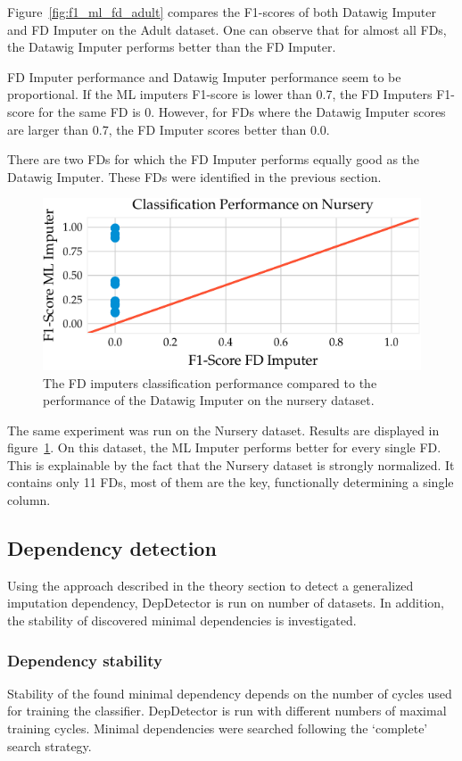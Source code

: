 Figure~\ref{fig:f1_ml_fd_adult} compares the F1-scores of both Datawig Imputer and FD Imputer on the Adult dataset.
One can observe that for almost all FDs, the Datawig Imputer performs better than the FD Imputer.

FD Imputer performance and Datawig Imputer performance seem to be proportional.
If the ML imputers F1-score is lower than 0.7, the FD Imputers F1-score for the same FD is 0.
However, for FDs where the Datawig Imputer scores are larger than 0.7, the FD Imputer scores better than 0.0.

There are two FDs for which the FD Imputer performs equally good as the Datawig Imputer.
These FDs were identified in the previous section.

\begin{figure}[ht]
     \centering
     \includegraphics[width=.8\textwidth]{../figures/nursery/f1_ml_fd_nursery}
     \caption{The FD imputers classification performance compared to the performance of the Datawig Imputer on the nursery dataset.}
     \label{fig:f1_ml_fd_nursery}
\end{figure}

The same experiment was run on the Nursery dataset.\cite{DUA19}
Results are displayed in figure~\ref{fig:f1_ml_fd_nursery}.
On this dataset, the ML Imputer performs better for every single FD.
This is explainable by the fact that the Nursery dataset is strongly normalized.
It contains only 11 FDs, most of them are the key, functionally determining a single column.

\subsection{Dependency detection}
Using the approach described in the theory section to detect a generalized imputation dependency, DepDetector is run on number of datasets.
In addition, the stability of discovered minimal dependencies is investigated.

\subsubsection{Dependency stability}
Stability of the found minimal dependency depends on the number of cycles used for training the classifier.
DepDetector is run with different numbers of maximal training cycles.
Minimal dependencies were searched following the `complete' search strategy.

